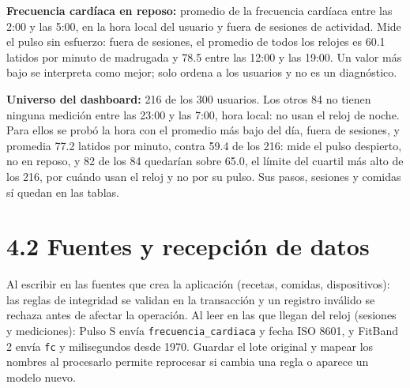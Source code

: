 \documentclass[11pt]{article}
\begin{document}
\textbf{Frecuencia cardíaca en reposo:} promedio de la frecuencia cardíaca entre
las 2:00 y las 5:00, en la hora local del usuario y fuera de sesiones de
actividad. Mide el pulso sin esfuerzo: fuera de sesiones, el promedio de todos los relojes
es 60.1 latidos por minuto de madrugada y 78.5 entre las 12:00 y las 19:00. Un valor más bajo se interpreta como mejor; solo ordena a los usuarios
y no es un diagnóstico.

\textbf{Universo del dashboard:} 216 de los 300 usuarios. Los otros 84 no tienen
ninguna medición entre las 23:00 y las 7:00, hora local: no usan el reloj de
noche. Para ellos se probó la hora con el promedio más bajo del día, fuera de
sesiones, y promedia 77.2 latidos por minuto, contra 59.4 de los 216: mide el
pulso despierto, no en reposo, y 82 de los 84 quedarían sobre 65.0, el límite
del cuartil más alto de los 216, por cuándo usan el reloj y no por su pulso. Sus pasos, sesiones y comidas sí quedan en
las tablas.

\section{4.2 Fuentes y recepción de datos}

 Al escribir
en las fuentes que crea la aplicación (recetas, comidas, dispositivos): las
reglas de integridad se validan en la transacción y un registro inválido se
rechaza antes de afectar la operación. Al leer en las que llegan del reloj
(sesiones y mediciones): Pulso S envía \texttt{frecuencia\_cardiaca} y fecha ISO
8601, y FitBand 2 envía \texttt{fc} y milisegundos desde 1970. Guardar el lote
original y mapear los nombres al procesarlo permite reprocesar si cambia una regla o aparece un modelo nuevo.
\end{document}
